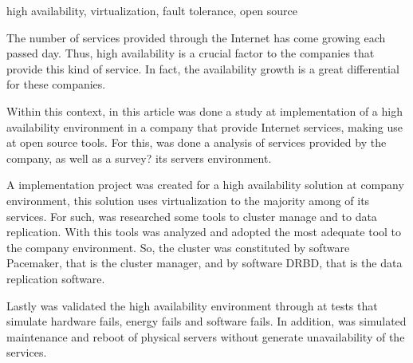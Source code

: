 \begin{englishabstract}{}{high availability, virtualization, fault tolerance, open source}

The number of services provided through the Internet has come growing each passed day. Thus, high availability is a crucial factor to the 
companies that provide this kind of service. In fact, the availability growth is a great differential for these companies.

Within this context, in this article was done a study at implementation of a high availability environment in a company that provide 
Internet services, making use at open source tools. For this, was done a analysis of services provided by the company, 
as well as a survey? its servers environment.

A implementation project was created for a high availability solution at company environment, this solution uses virtualization to the majority
among of its services. For such, was researched some tools to cluster manage and to data replication. With this tools was analyzed and 
adopted the most adequate tool to the company environment. So, the cluster was constituted by software Pacemaker, that is the cluster manager, 
and by software DRBD, that is the data replication software.

Lastly was validated the high availability environment through at tests that simulate hardware fails, energy fails and software fails. 
In addition, was simulated maintenance and reboot of physical servers without generate unavailability of the services.

\end{englishabstract}
